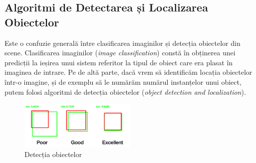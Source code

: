 \subsection{Algoritmi de Detectarea și Localizarea Obiectelor}
Este o confuzie generală între clasificarea imaginilor și detecția obiectelor din scene. Clasificarea imaginilor (\textit{image classification}) constă în obținerea unei predicții la ieșirea unui sistem referitor la tipul de obiect care era plasat în imaginea de intrare. Pe de altă parte, dacă vrem să identificăm locația obiectelor într-o imagine, și de exemplu să le numărăm numărul instanțelor unui obiect, putem folosi algoritmi de detecția obiectelor (\textit{object detection and localization}).\newline
\begin{figure}[h!]
    	\centering
	\captionsetup{justification=centering, margin=2cm}
	\includegraphics[width=0.5\textwidth]{figures/iou.png}
	\caption{Detecția obiectelor \cite{class_detect_segment}}
	\label{fig:class_detect_segment}
\end{figure}

